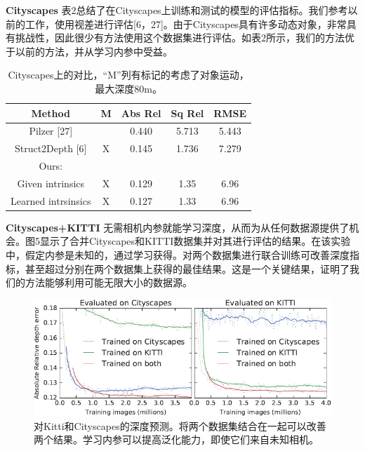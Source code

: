 \documentclass[10pt,journal,compsoc,UTF8]{IEEEtran}
\begin{document}
\textbf{Cityscapes} 表2总结了在Cityscapes上训练和测试的模型的评估指标。我们参考以前的工作，使用视差进行评估[6，27]。由于Cityscapes具有许多动态对象，非常具有挑战性，因此很少有方法使用这个数据集进行评估。如表2所示，我们的方法优于以前的方法，并从学习内参中受益。
\begin{table}
  \centering
  \begin{tabular}{|c|c|c|c|c|}
  \hline
  Method&M&Abs Rel&Sq Rel& RMSE\\
  \hline
  Pilzer [27]         & & 0.440& 5.713& 5.443\\
  Struct2Depth [6]    &X& 0.145& 1.736& 7.279\\
  \hline
  Ours:&&&&\\
  Given intrinsics    &X& 0.129& 1.35 & 6.96\\ 
  Learned intrsinsics &X& 0.127& 1.33 & 6.96\\ 
  \hline
  \end{tabular}
  \caption{Cityscapes上的对比，“M”列有标记的考虑了对象运动，最大深度80m。}
\end{table}

\textbf{Cityscapes+KITTI} 无需相机内参就能学习深度，从而为从任何数据源提供了机会。图5显示了合并Cityscapes和KITTI数据集并对其进行评估的结果。在该实验中，假定内参是未知的，通过学习获得。对两个数据集进行联合训练可改善深度指标，甚至超过分别在两个数据集上获得的最佳结果。这是一个关键结果，证明了我们的方法能够利用可能无限大小的数据源。
\begin{figure}[htbp]
  \begin{framed}
     \centering
       \includegraphics[width=1\linewidth]{imgs/5.png} 
     \caption{对Kitti和Cityscapes的深度预测。将两个数据集结合在一起可以改善两个结果。学习内参可以提高泛化能力，即使它们来自未知相机。}
  \end{framed}
  \end{figure}
\end{document}

